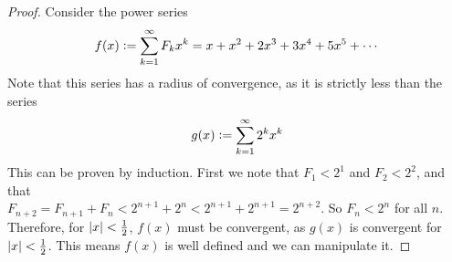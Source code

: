 \begin{proof}
Consider the power series
\begin{equation*}
f(x) \vcentcolon= \sum_{k=1}^\infty F_k x^k = x + x^2 + 2x^3 + 3x^4 + 5x^5
    + \dotsb
\end{equation*}
Note that this series has a radius of convergence, as it is strictly less
than the series
\begin{equation*}
g(x) \vcentcolon= \sum_{k=1}^\infty 2^k x^k
\end{equation*}
This can be proven by induction. First we note that \(F_1 < 2^1\) and
\(F_2 < 2^2\), and that \\
\(F_{n + 2} = F_{n + 1} + F_n < 2^{n + 1} + 2^n < 2^{n + 1} + 2^{n + 1}
    = 2^{n + 2}\). So \(F_n < 2^n\) for all \(n\). Therefore, for
\(\abs{x} < \frac 12\), \(f(x)\)  must be convergent, as \(g(x)\) is
convergent for \(\abs{x} < \frac 12\). This means \(f(x)\) is well defined
and we can manipulate it.


\end{proof}
